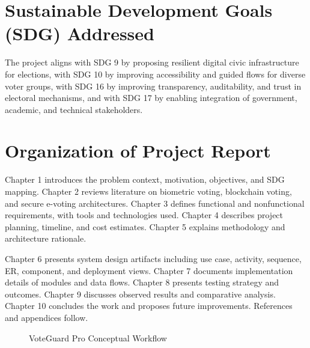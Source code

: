 \section{Sustainable Development Goals (SDG) Addressed}
The project aligns with SDG 9 by proposing resilient digital civic infrastructure for elections, with SDG 10 by improving accessibility and guided flows for diverse voter groups, with SDG 16 by improving transparency, auditability, and trust in electoral mechanisms, and with SDG 17 by enabling integration of government, academic, and technical stakeholders.

\section{Organization of Project Report}
Chapter 1 introduces the problem context, motivation, objectives, and SDG mapping. Chapter 2 reviews literature on biometric voting, blockchain voting, and secure e-voting architectures. Chapter 3 defines functional and nonfunctional requirements, with tools and technologies used. Chapter 4 describes project planning, timeline, and cost estimates. Chapter 5 explains methodology and architecture rationale.

Chapter 6 presents system design artifacts including use case, activity, sequence, ER, component, and deployment views. Chapter 7 documents implementation details of modules and data flows. Chapter 8 presents testing strategy and outcomes. Chapter 9 discusses observed results and comparative analysis. Chapter 10 concludes the work and proposes future improvements. References and appendices follow.

\begin{figure}[htbp]
\centering
{}
\caption{VoteGuard Pro Conceptual Workflow}
\end{figure}

\clearpage
